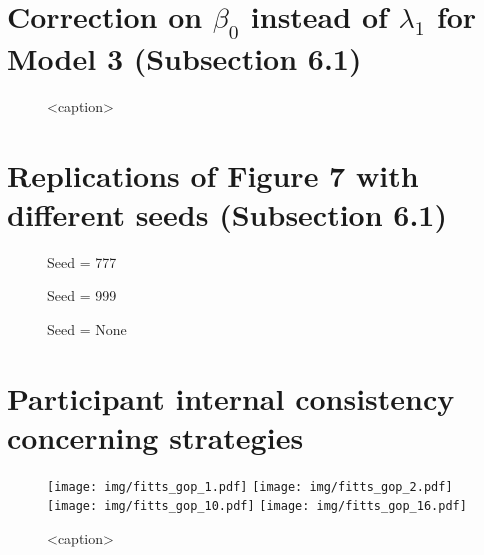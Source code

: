 \documentclass{article}
\begin{document}
\section{Correction on $\beta_0$ instead of $\lambda_1$ for Model 3 (Subsection 6.1)}

\begin{figure}[htbp]
    \centering
    \caption{<caption>}
    \label{<label>}
\end{figure}

\section{Replications of Figure 7 with different seeds (Subsection 6.1)}

\begin{figure}[htbp]
    \centering
    \caption{Seed = 777}
    \label{<label>}
\end{figure}
\begin{figure}[htbp]
    \centering
    \caption{Seed = 999}
    \label{<label>}
\end{figure}
\begin{figure}[htbp]
    \centering
    \caption{Seed = None}
    \label{<label>}
\end{figure}

\section{Participant internal consistency concerning strategies}

\begin{figure}[htbp]
    \centering
    \texttt{[image: img/fitts\_gop\_1.pdf]}
    \texttt{[image: img/fitts\_gop\_2.pdf]} \\
    \texttt{[image: img/fitts\_gop\_10.pdf]}
    \texttt{[image: img/fitts\_gop\_16.pdf]}
    \caption{<caption>}
    \label{<label>}
\end{figure}
\end{document}
